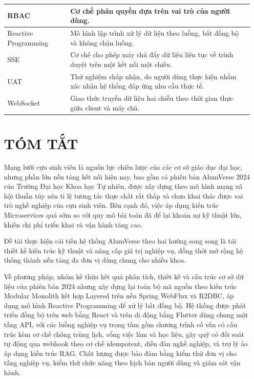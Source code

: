 \documentclass[12pt,a4paper,oneside]{report}
\begin{document}
\begin{longtable}{|>{\raggedright\arraybackslash}p{3.2cm}|>{\raggedright\arraybackslash}p{11.3cm}|}
RBAC & Cơ chế phân quyền dựa trên vai trò của người dùng. \\ \hline
Reactive Programming & Mô hình lập trình xử lý dữ liệu theo luồng, bất đồng bộ và không chặn luồng. \\ \hline
SSE & Cơ chế cho phép máy chủ đẩy dữ liệu liên tục về trình duyệt trên một kết nối một chiều. \\ \hline
UAT & Thử nghiệm chấp nhận, do người dùng thực hiện nhằm xác nhận hệ thống đáp ứng nhu cầu thực tế. \\ \hline
WebSocket & Giao thức truyền dữ liệu hai chiều theo thời gian thực giữa client và máy chủ. \\ \hline
\end{longtable}
\renewcommand{\arraystretch}{1}

\newpage
\chapter*{TÓM TẮT}

Mạng lưới cựu sinh viên là nguồn lực chiến lược của các cơ sở giáo dục đại học, nhưng phần lớn nền tảng kết nối hiện nay, bao gồm cả phiên bản AlumVerse 2024 của Trường Đại học Khoa học Tự nhiên, được xây dựng theo mô hình mạng xã hội thuần túy nên tỉ lệ tương tác thực chất rất thấp và chưa khai thác được vai trò nghề nghiệp của cựu sinh viên. Bên cạnh đó, việc áp dụng kiến trúc Microservices quá sớm so với quy mô bài toán đã để lại khoản nợ kỹ thuật lớn, khiến chi phí triển khai và vận hành tăng cao.

Đề tài thực hiện cải tiến hệ thống AlumVerse theo hai hướng song song là tái thiết kế kiến trúc kỹ thuật và nâng cấp giá trị nghiệp vụ, đồng thời mở rộng hệ thống thành nền tảng đa đơn vị dùng chung cho nhiều khoa.

Về phương pháp, nhóm kế thừa kết quả phân tích, thiết kế và cấu trúc cơ sở dữ liệu của phiên bản 2024 nhưng xây dựng lại toàn bộ mã nguồn theo kiến trúc Modular Monolith kết hợp Layered trên nền Spring WebFlux và R2DBC, áp dụng mô hình Reactive Programming để xử lý bất đồng bộ. Hệ thống được phát triển đồng bộ trên web bằng React và trên di động bằng Flutter dùng chung một tầng API, với các luồng nghiệp vụ trọng tâm gồm chương trình cố vấn có cấu trúc kèm cơ chế chống trùng lịch, cổng việc làm và học liệu, gây quỹ có đối soát tự động qua webhook theo cơ chế idempotent, diễn đàn nghề nghiệp, và trợ lý ảo áp dụng kiến trúc RAG. Chất lượng được bảo đảm bằng kiểm thử đơn vị cho tầng nghiệp vụ, kiểm thử chức năng theo kịch bản người dùng và giám sát vận hành.
\end{document}
